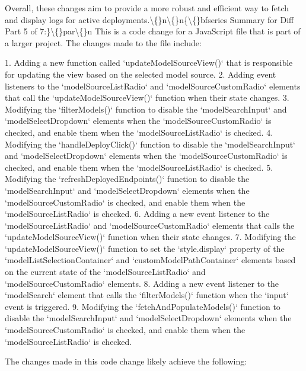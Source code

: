 \documentclass{article}
\begin{document}
{Overall, these changes aim to provide a more robust and efficient way to fetch and display logs for active deployments.\textbackslash\{\}n\textbackslash\{\}n\{\textbackslash\{\}bfseries Summary for Diff Part 5 of 7:\}\textbackslash\{\}par\textbackslash\{\}n  This is a code change for a JavaScript file that is part of a larger project. The changes made to the file include:

1. Adding a new function called `updateModelSourceView()` that is responsible for updating the view based on the selected model source.
2. Adding event listeners to the `modelSourceListRadio` and `modelSourceCustomRadio` elements that call the `updateModelSourceView()` function when their state changes.
3. Modifying the `filterModels()` function to disable the `modelSearchInput` and `modelSelectDropdown` elements when the `modelSourceCustomRadio` is checked, and enable them when the `modelSourceListRadio` is checked.
4. Modifying the `handleDeployClick()` function to disable the `modelSearchInput` and `modelSelectDropdown` elements when the `modelSourceCustomRadio` is checked, and enable them when the `modelSourceListRadio` is checked.
5. Modifying the `refreshDeployedEndpoints()` function to disable the `modelSearchInput` and `modelSelectDropdown` elements when the `modelSourceCustomRadio` is checked, and enable them when the `modelSourceListRadio` is checked.
6. Adding a new event listener to the `modelSourceListRadio` and `modelSourceCustomRadio` elements that calls the `updateModelSourceView()` function when their state changes.
7. Modifying the `updateModelSourceView()` function to set the `style.display` property of the `modelListSelectionContainer` and `customModelPathContainer` elements based on the current state of the `modelSourceListRadio` and `modelSourceCustomRadio` elements.
8. Adding a new event listener to the `modelSearch` element that calls the `filterModels()` function when the `input` event is triggered.
9. Modifying the `fetchAndPopulateModels()` function to disable the `modelSearchInput` and `modelSelectDropdown` elements when the `modelSourceCustomRadio` is checked, and enable them when the `modelSourceListRadio` is checked.

The changes made in this code change likely achieve the following:

}
\end{document}
